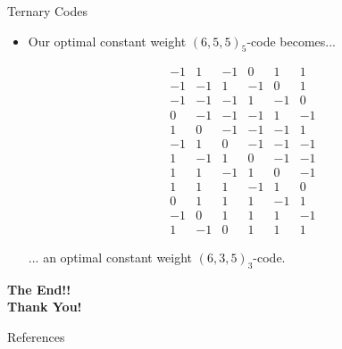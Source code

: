 \documentclass{beamer}
\begin{document}
 \begin{frame}{Ternary Codes}
  \begin{itemize}
   \item Our optimal constant weight $(6,5,5)_5$-code becomes...
  \begin{small}
  \[
   \begin{array}{rrrrrr}
-1 & 1 & -1 & 0 & 1 & 1 \\
-1 & -1 & 1 & -1 & 0 & 1 \\
-1 & -1 & -1 & 1 & -1 & 0 \\
0 & -1 & -1 & -1 & 1 & -1 \\
1 & 0 & -1 & -1 & -1 & 1 \\
-1 & 1 & 0 & -1 & -1 & -1 \\ \hline
1 & -1 & 1 & 0 & -1 & -1 \\
1 & 1 & -1 & 1 & 0 & -1 \\
1 & 1 & 1 & -1 & 1 & 0 \\
0 & 1 & 1 & 1 & -1 & 1 \\
-1 & 0 & 1 & 1 & 1 & -1 \\
1 & -1 & 0 & 1 & 1 & 1
   \end{array}
  \]
  \end{small}
  ... an optimal constant weight $(6,3,5)_3$-code.
  \end{itemize}

 \end{frame}
 
 
 \begin{frame}
 
  \begin{center}
   {\huge\bf The End!!}\\
   
   {\bf Thank You!}
  \end{center}

 \end{frame}

 
 \begin{frame}{References}
  
  
 \end{frame}
 
 
\end{document}
